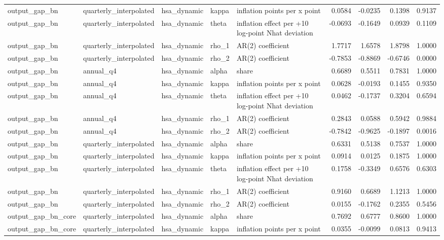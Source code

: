 \begin{tabular}{lllllrrrr}
output\_gap\_bn & quarterly\_interpolated & hsa\_dynamic & kappa & inflation points per x point & 0.0584 & -0.0235 & 0.1398 & 0.9137 \\
output\_gap\_bn & quarterly\_interpolated & hsa\_dynamic & theta & inflation effect per +10 log-point Nhat deviation & -0.0693 & -0.1649 & 0.0939 & 0.1109 \\
output\_gap\_bn & quarterly\_interpolated & hsa\_dynamic & rho\_1 & AR(2) coefficient & 1.7717 & 1.6578 & 1.8798 & 1.0000 \\
output\_gap\_bn & quarterly\_interpolated & hsa\_dynamic & rho\_2 & AR(2) coefficient & -0.7853 & -0.8869 & -0.6746 & 0.0000 \\
output\_gap\_bn & annual\_q4 & hsa\_dynamic & alpha & share & 0.6689 & 0.5511 & 0.7831 & 1.0000 \\
output\_gap\_bn & annual\_q4 & hsa\_dynamic & kappa & inflation points per x point & 0.0628 & -0.0193 & 0.1455 & 0.9350 \\
output\_gap\_bn & annual\_q4 & hsa\_dynamic & theta & inflation effect per +10 log-point Nhat deviation & 0.0462 & -0.1737 & 0.3204 & 0.6594 \\
output\_gap\_bn & annual\_q4 & hsa\_dynamic & rho\_1 & AR(2) coefficient & 0.2843 & 0.0588 & 0.5942 & 0.9884 \\
output\_gap\_bn & annual\_q4 & hsa\_dynamic & rho\_2 & AR(2) coefficient & -0.7842 & -0.9625 & -0.1897 & 0.0016 \\
output\_gap\_bn & quarterly\_interpolated & hsa\_dynamic & alpha & share & 0.6331 & 0.5138 & 0.7537 & 1.0000 \\
output\_gap\_bn & quarterly\_interpolated & hsa\_dynamic & kappa & inflation points per x point & 0.0914 & 0.0125 & 0.1875 & 1.0000 \\
output\_gap\_bn & quarterly\_interpolated & hsa\_dynamic & theta & inflation effect per +10 log-point Nhat deviation & 0.1758 & -0.3349 & 0.6576 & 0.6303 \\
output\_gap\_bn & quarterly\_interpolated & hsa\_dynamic & rho\_1 & AR(2) coefficient & 0.9160 & 0.6689 & 1.1213 & 1.0000 \\
output\_gap\_bn & quarterly\_interpolated & hsa\_dynamic & rho\_2 & AR(2) coefficient & 0.0155 & -0.1762 & 0.2355 & 0.5456 \\
output\_gap\_bn\_core & quarterly\_interpolated & hsa\_dynamic & alpha & share & 0.7692 & 0.6777 & 0.8600 & 1.0000 \\
output\_gap\_bn\_core & quarterly\_interpolated & hsa\_dynamic & kappa & inflation points per x point & 0.0355 & -0.0099 & 0.0813 & 0.9413 \\

\end{tabular}
